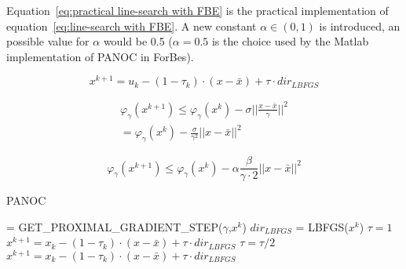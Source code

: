 	 Equation~\ref{eq:practical line-search with FBE} is the practical implementation of equation~\ref{eq:line-search with FBE}. A new constant $\alpha \in (0,1)$ is introduced, an possible value for $\alpha$ would be 0.5 ($\alpha=0.5$ is the choice used by the Matlab implementation of PANOC in ForBes).
	
	\begin{equation}
		x^{k+1} = u_k - (1-\tau_k)\cdot (x-\bar{x}) + \tau \cdot dir_{LBFGS}
		\label{eq:linea-search tau definition}
	\end{equation}
	
	\begin{eqnarray}
		\label{eq:line-search with FBE}
		\varphi_{\gamma}(x^{k+1})\leq\varphi_{\gamma}(x^{k}) - \sigma ||\frac{x-\bar{x}}{\gamma}||^2 \\
		=
		\varphi_{\gamma}(x^{k}) - \frac{\sigma}{\gamma^2} ||x-\bar{x}||^2
	\end{eqnarray}
	
	\begin{equation}
		\varphi_{\gamma}(x^{k+1}) \leq 		\varphi_{\gamma}(x^{k}) - \alpha \frac{\beta }{\gamma \cdot 2} ||x-\bar{x}||^2
		\label{eq:practical line-search with FBE}
	\end{equation}
	
	
		
		\begin{algorithm}
			\caption{PANOC}
			\label{alg:PANOC}
			\begin{algorithmic}[1]
				 = GET\_PROXIMAL\_GRADIENT\_STEP($\gamma$,$x^k$)
				\State $ dir_{LBFGS}$ = LBFGS($x^k$)
				\State $\tau =1$
				\State $x^{k+1} = x_k - (1-\tau_k)\cdot (x-\bar{x}) + \tau \cdot dir_{LBFGS}$
				\State $\tau = \tau / 2$
				\State $x^{k+1} = x_k - (1-\tau_k)\cdot (x-\bar{x}) + \tau \cdot dir_{LBFGS}$
				\EndWhile
				\EndProcedure
			\end{algorithmic}
		\end{algorithm}
	